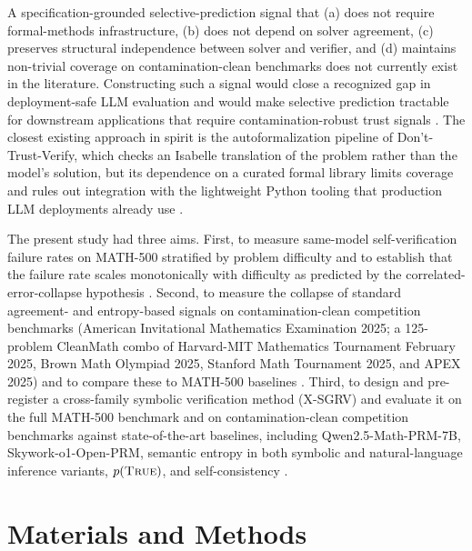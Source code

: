 \documentclass[11pt]{article}
\begin{document}
A specification-grounded selective-prediction signal that (a) does not require formal-methods infrastructure, (b) does not depend on solver agreement, (c) preserves structural independence between solver and verifier, and (d) maintains non-trivial coverage on contamination-clean benchmarks does not currently exist in the literature. Constructing such a signal would close a recognized gap in deployment-safe LLM evaluation and would make selective prediction tractable for downstream applications that require contamination-robust trust signals \citep{kuhn2023semantic, ste2024, dtv2024}. The closest existing approach in spirit is the autoformalization pipeline of Don't-Trust-Verify, which checks an Isabelle translation of the problem rather than the model's solution, but its dependence on a curated formal library limits coverage and rules out integration with the lightweight Python tooling that production LLM deployments already use \citep{dtv2024, hermes2025}.

The present study had three aims. First, to measure same-model self-verification failure rates on MATH-500 stratified by problem difficulty and to establish that the failure rate scales monotonically with difficulty as predicted by the correlated-error-collapse hypothesis \citep{huang2024selfcorrect, tyen2024llm, stechly2024selfverify, kim2025correlated}. Second, to measure the collapse of standard agreement- and entropy-based signals on contamination-clean competition benchmarks (American Invitational Mathematics Examination 2025; a 125-problem CleanMath combo of Harvard-MIT Mathematics Tournament February 2025, Brown Math Olympiad 2025, Stanford Math Tournament 2025, and APEX 2025) and to compare these to MATH-500 baselines \citep{wu2025contam, matharena2025}. Third, to design and pre-register a cross-family symbolic verification method (X-SGRV) and evaluate it on the full MATH-500 benchmark and on contamination-clean competition benchmarks against state-of-the-art baselines, including Qwen2.5-Math-PRM-7B, Skywork-o1-Open-PRM, semantic entropy in both symbolic and natural-language inference variants, $p(\textsc{True})$, and self-consistency \citep{qwenprm2025, skyworkprm2024, kuhn2023semantic, farquhar2024nature, kadavath2022, wang2023selfconsistency}.

\section{Materials and Methods}
\end{document}

